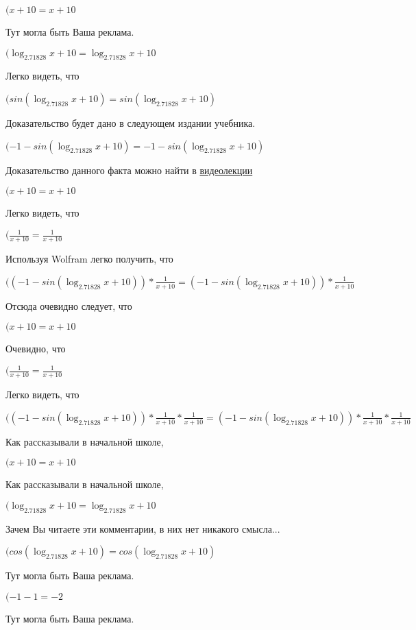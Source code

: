 \documentclass[12pt,a4paper,fleqn]{article}
\theoremstyle{definition}
\begin{document}
$( x  +  10  =  x  +  10 $

Тут могла быть Ваша реклама.

$(\log_{ 2.71828 }{ x  +  10 } = \log_{ 2.71828 }{ x  +  10 }$

Легко видеть, что

$(sin(\log_{ 2.71828 }{ x  +  10 }) = sin(\log_{ 2.71828 }{ x  +  10 })$

Доказательство будет дано в следующем издании учебника.

$( -1  - sin(\log_{ 2.71828 }{ x  +  10 }) =  -1  - sin(\log_{ 2.71828 }{ x  +  10 })$

Доказательство данного факта можно найти в \href{https://www.youtube.com/watch?v=dQw4w9WgXcQ}{видеолекции}

$( x  +  10  =  x  +  10 $

Легко видеть, что

$(\frac{ 1 }{ x  +  10 }
 = \frac{ 1 }{ x  +  10 }
$

Используя Wolfram легко получить, что

$(( -1  - sin(\log_{ 2.71828 }{ x  +  10 })) * \frac{ 1 }{ x  +  10 }
 = ( -1  - sin(\log_{ 2.71828 }{ x  +  10 })) * \frac{ 1 }{ x  +  10 }
$

Отсюда очевидно следует, что

$( x  +  10  =  x  +  10 $

Очевидно, что

$(\frac{ 1 }{ x  +  10 }
 = \frac{ 1 }{ x  +  10 }
$

Легко видеть, что

$(( -1  - sin(\log_{ 2.71828 }{ x  +  10 })) * \frac{ 1 }{ x  +  10 }
 * \frac{ 1 }{ x  +  10 }
 = ( -1  - sin(\log_{ 2.71828 }{ x  +  10 })) * \frac{ 1 }{ x  +  10 }
 * \frac{ 1 }{ x  +  10 }
$

Как рассказывали в начальной школе,

$( x  +  10  =  x  +  10 $

Как рассказывали в начальной школе,

$(\log_{ 2.71828 }{ x  +  10 } = \log_{ 2.71828 }{ x  +  10 }$

Зачем Вы читаете эти комментарии, в них нет никакого смысла...

$(cos(\log_{ 2.71828 }{ x  +  10 }) = cos(\log_{ 2.71828 }{ x  +  10 })$

Тут могла быть Ваша реклама.

$( -1  -  1  =  -2 $

Тут могла быть Ваша реклама.
\end{document}
